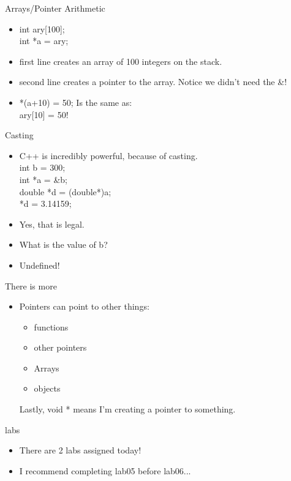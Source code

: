 \documentclass{beamer}
\begin{document}
\begin{frame}{Arrays/Pointer Arithmetic}
\begin{itemize}
\item int ary[100];\\
int *a = ary;
\item first line creates an array of 100 integers on the stack.
\item second line creates a pointer to the array.  Notice we didn't need the \&!
\item *(a+10) = 50; Is the same as:\\
ary[10] = 50!
\end{itemize}
\end{frame}

\begin{frame}{Casting}
\begin{itemize}
\item C++ is incredibly powerful, because of casting.\\
int b = 300; \\
int *a = \&b; \\
double *d = (double*)a; \\
*d = 3.14159;
\item Yes, that is legal. 
\item What is the value of b?
\item <2-> Undefined!
\end{itemize}
\end{frame}

\begin{frame}{There is more}
\begin{itemize}
\item Pointers can point to other things:
\begin{itemize}
\item functions
\item other pointers
\item Arrays
\item objects
\end{itemize}
Lastly, void * means I'm creating a pointer to something.
\end{itemize}
\end{frame}

\begin{frame}{labs}
\begin{itemize}
\item There are 2 labs assigned today!
\item I recommend completing lab05 before lab06...
\end{itemize}
\end{frame}
\end{document}
